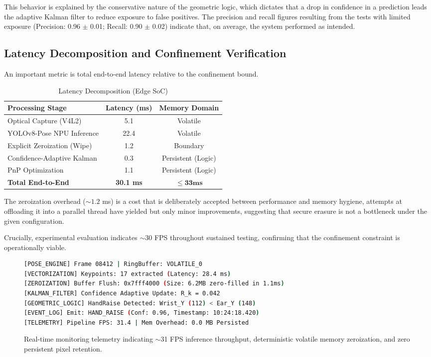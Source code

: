 \documentclass[conference]{IEEEtran}
\begin{document}
This behavior is explained by the conservative nature of the geometric logic, which dictates that a drop in confidence in a prediction leads the adaptive Kalman filter to reduce exposure to false positives. The precision and recall figures resulting from the tests with limited exposure (Precision: 0.96 $\pm$ 0.01; Recall: 0.90 $\pm$ 0.02) indicate that, on average, the system performed as intended.

\subsection{Latency Decomposition and Confinement Verification}
An important metric is total end-to-end latency relative to the confinement bound.

\begin{table}[htbp]
\caption{Latency Decomposition (Edge SoC)}
\begin{center}
\begin{tabular}{lcc}
\toprule
\textbf{Processing Stage} & \textbf{Latency (ms)} & \textbf{Memory Domain} \\
\midrule
Optical Capture (V4L2) & 5.1 & Volatile \\
YOLOv8-Pose NPU Inference & 22.4 & Volatile \\
Explicit Zeroization (Wipe) & 1.2 & Boundary \\
Confidence-Adaptive Kalman & 0.3 & Persistent (Logic) \\
PnP Optimization & 1.1 & Persistent (Logic) \\
\midrule
\textbf{Total End-to-End} & \textbf{30.1 ms} & $\mathbf{\le 33 ms}$ \\
\bottomrule
\end{tabular}
\end{center}
\end{table}

The zeroization overhead ($\sim 1.2$ ms) is a cost that is deliberately accepted between performance and memory hygiene, attempts at offloading it into a parallel thread have yielded but only minor improvements, suggesting that secure erasure is not a bottleneck under the given configuration.

Crucially, experimental evaluation indicates $\sim$30 FPS throughout sustained testing, confirming that the confinement constraint is operationally viable.

\begin{figure}[htbp]
\begin{lstlisting}[language=bash]
[POSE_ENGINE] Frame 08412 | RingBuffer: VOLATILE_0
[VECTORIZATION] Keypoints: 17 extracted (Latency: 28.4 ms)
[ZEROIZATION] Buffer Flush: 0x7fff4000 (Size: 6.2MB zero-filled in 1.1ms)
[KALMAN_FILTER] Confidence Adaptive Update: R_k = 0.042
[GEOMETRIC_LOGIC] HandRaise Detected: Wrist_Y (112) < Ear_Y (148)
[EVENT_LOG] Emit: HAND_RAISE (Conf: 0.96, Timestamp: 10:24:18.420)
[TELEMETRY] Pipeline FPS: 31.4 | Mem Overhead: 0.0 MB Persisted
\end{lstlisting}
\caption{Real-time monitoring telemetry indicating $\sim$31 FPS inference throughput, deterministic volatile memory zeroization, and zero persistent pixel retention.}
\label{fig:terminal_logs}
\end{figure}
\end{document}

